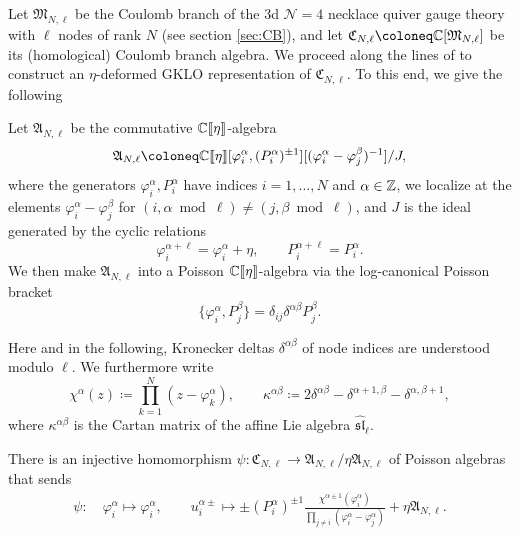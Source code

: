 Let $\mathfrak{M}_{N,\ell}$ be the Coulomb branch of the 3d $\mathcal{N}=4$ necklace quiver gauge theory with $\ell$ nodes of rank $N$ (see section \ref{sec:CB}), and let $\mathfrak{C}_{N,\ell} \coloneq \C[\mathfrak{M}_{N,\ell}]$ be its (homological) Coulomb branch algebra. We proceed along the lines of \cite{gerasimov_class_2005-1} to construct an $\eta$-deformed GKLO representation of $\mathfrak{C}_{N,\ell}$. To this end, we give the following

\begin{definition}\label{def:ratDiffOps}
    Let $\mathfrak{A}_{N,\ell}$ be the commutative $\mathbb{C}\llbracket \eta \rrbracket$-algebra
    \begin{equation}
        \mathfrak{A}_{N,\ell} \coloneq \C\llbracket \eta \rrbracket[\varphi_i^\alpha,(P_i^\alpha)^{\pm 1}][(\varphi_i^\alpha-\varphi_j^\beta)^{-1}]/J,
    \end{equation}
    where the generators $\varphi_i^\alpha,P_i^\alpha$ have indices $i=1,\dots,N$ and $\alpha \in \mathbb{Z}$, we localize at the elements $\varphi_i^\alpha-\varphi_j^\beta$ for $(i,\alpha \bmod \ell) \neq (j,\beta \bmod \ell)$, and $J$ is the ideal generated by the cyclic relations
    \begin{equation}
        \varphi_i^{\alpha+\ell} = \varphi_i^\alpha + \eta, \qquad P_i^{\alpha+\ell} = P_i^\alpha.
    \end{equation}
    We then make $\mathfrak{A}_{N,\ell}$ into a Poisson $\mathbb{C}\llbracket \eta \rrbracket$-algebra via the log-canonical Poisson bracket
    \begin{equation}
        \{ \varphi_i^\alpha, P_j^\beta \} = \delta_{ij} \delta^{\alpha\beta} P_j^\beta.
    \end{equation}
\end{definition}

Here and in the following, Kronecker deltas $\delta^{\alpha\beta}$ of node indices are understood modulo $\ell$. We furthermore write
\begin{equation}
    \chi^\alpha(z) \coloneq \prod_{k=1}^N (z-\varphi_k^\alpha), \qquad \kappa^{\alpha\beta} \coloneq 2\delta^{\alpha\beta} - \delta^{\alpha+1,\beta} - \delta^{\alpha,\beta+1},
\end{equation}
where $\kappa^{\alpha\beta}$ is the Cartan matrix of the affine Lie algebra $\widehat{\mathfrak{sl}}_\ell$.

\begin{prop}
    There is an injective homomorphism $\psi\colon \mathfrak{C}_{N,\ell} \to \mathfrak{A}_{N,\ell}/\eta \mathfrak{A}_{N,\ell}$ of Poisson algebras that sends
    \begin{equation}
        \begin{aligned}
            \psi\colon \quad 
            \varphi_i^\alpha \mapsto \varphi_i^\alpha, \qquad
            u_i^{\alpha\pm} \mapsto \pm (P_i^\alpha)^{\pm 1} \frac{\chi^{\alpha \pm 1}(\varphi_i^\alpha)}{\prod_{j \neq i} (\varphi_i^\alpha-\varphi_j^\alpha)} + \eta \mathfrak{A}_{N,\ell}.
        \end{aligned}
    \end{equation}
\end{prop}

